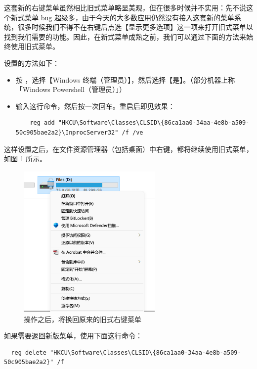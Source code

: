 这套新的右键菜单虽然相比旧式菜单略显美观，但在很多时候并不实用：先不说这个新式菜单 bug 超级多，由于今天的大多数应用仍然没有接入这套新的菜单系统，很多时候我们不得不在右键后点选【显示更多选项】这一项来打开旧式菜单以找到我们需要的功能。因此，在新式菜单成熟之前，我们可以通过下面的方法来始终使用旧式菜单。

设置的方法如下：

\begin{itemize}
  \item 按 ，选择【Windows 终端（管理员）】，然后选择【是】。（部分机器上称「Windows Powershell（管理员）」）
  \item 输入这行命令，然后按一次回车。重启后即见效果：
  \begin{lstlisting}
    reg add "HKCU\Software\Classes\CLSID\{86ca1aa0-34aa-4e8b-a509-50c905bae2a2}\InprocServer32" /f /ve
  \end{lstlisting}
\end{itemize}

这样设置之后，在文件资源管理器（包括桌面）中右键，都将继续使用旧式菜单，如图 \ref{Old_menu} 所示。

\begin{figure}[htb!]
  \centering
  \includegraphics[width=7cm]{assets/Old_menu.png}
  \caption{操作之后，将换回原来的旧式右键菜单}
  \label{Old_menu}
\end{figure}

如果需要返回新版菜单，使用下面这行命令：

\begin{lstlisting}
  reg delete "HKCU\Software\Classes\CLSID\{86ca1aa0-34aa-4e8b-a509-50c905bae2a2}" /f
\end{lstlisting}
